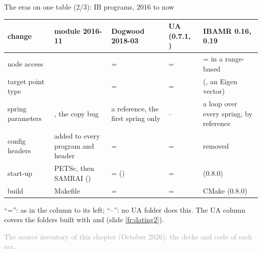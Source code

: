 \documentclass[aspectratio=169,11pt]{beamer}
\newcommand{\sourcecredit}[1]{\vfill\begin{flushright}\tiny\textcolor{DarkGray}{#1}\end{flushright}}
\begin{document}
\begin{frame}{The eras on one table (2/3): IB programs, 2016 to now}
\label{fr:table1b}
\scriptsize
\renewcommand{\arraystretch}{1.25}
\setlength{\tabcolsep}{3pt}
\begin{tabular}{@{}L{0.16\textwidth}L{0.19\textwidth}L{0.19\textwidth}L{0.19\textwidth}L{0.19\textwidth}@{}}
\toprule
change & module 2016-11 & Dogwood 2018-03 & UA (0.7.1, ) & IBAMR 0.16, 0.19 \\
\midrule
node access &  & = & = & = in a range-based  \\
target point type &  & = & = &  (, an Eigen vector) \\
spring parameters & , the copy bug & a reference, the first spring only & -- & a loop over every spring, by reference \\
config headers & added to every program and header & = & = & removed \\
start-up & PETSc, then SAMRAI () & = () & = &  (0.8.0) \\
build & Makefile & = & = & CMake (0.8.0) \\
\bottomrule
\end{tabular}

\vspace{2mm}
\footnotesize ``='': as in the column to its left; ``--'': no UA folder does this. The UA column covers the folders built with  and  (slide \ref{fr:dating2}).
\sourcecredit{The source inventory of this chapter (October 2026): the decks and code of each era.}
\end{frame}
\end{document}
